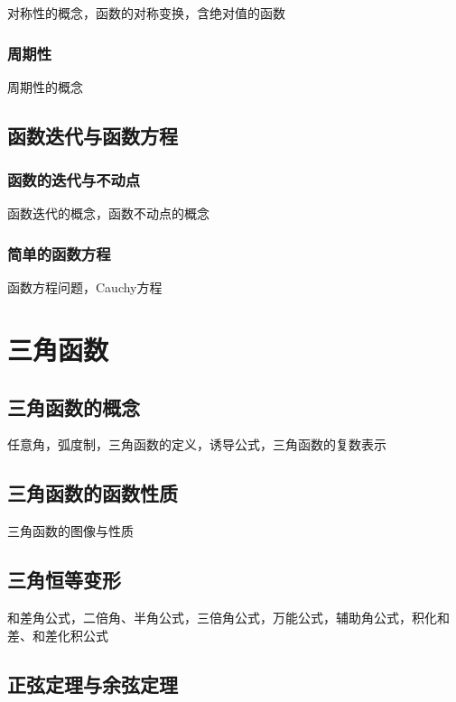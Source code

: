 \documentclass[lang=cn, zihao=4.5]{elegantbook}
\begin{document}
对称性的概念，函数的对称变换，含绝对值的函数

\subsection{周期性}

周期性的概念

\section{函数迭代与函数方程}

\subsection{函数的迭代与不动点}

函数迭代的概念，函数不动点的概念

\subsection{简单的函数方程}

函数方程问题，Cauchy方程

\chapter{三角函数}

\section{三角函数的概念}

任意角，弧度制，三角函数的定义，诱导公式，三角函数的复数表示

\section{三角函数的函数性质}

三角函数的图像与性质

\section{三角恒等变形}

和差角公式，二倍角、半角公式，三倍角公式，万能公式，辅助角公式，积化和差、和差化积公式

\section{正弦定理与余弦定理}
\end{document}
